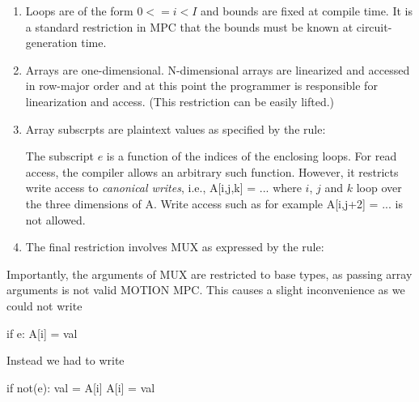 \documentclass[sigconf, screen, natbib=false, dvipsnames, table]{acmart}
\theoremstyle{definition}
\begin{document}
\begin{enumerate}
\item Loops are of the form $0 <= i < I$ and bounds are fixed at compile time. 
It is a standard restriction in MPC that the bounds must be known at circuit-generation time.
\item Arrays are one-dimensional. N-dimensional arrays are linearized and accessed 
in row-major order and at this point the programmer is responsible for linearization
and access. (This restriction can be easily lifted.)
\item Array subscrpts are plaintext values as specified by the rule:
\begin{semantics}
\end{semantics}
The subscript $e$ is a function of the indices of the enclosing loops. 
For read access, the compiler allows an arbitrary such function. 
However, it restricts write access to \emph{canonical writes}, i.e., {\sf A[i,j,k] = ...}
where $i$, $j$ and $k$ loop over the three dimensions of {\sf A}.  
Write access such as for example {\sf A[i,j+2] = ...} is not allowed. 
\item The final restriction involves MUX as expressed by the rule: 
\begin{semantics}
\end{semantics}
\end{enumerate}
Importantly, the arguments of MUX are restricted to base types, as passing array arguments 
is not valid MOTION MPC.  This causes a slight inconvenience as we could not write 
\begin{pythonn}
if e: A[i] = val
\end{pythonn}
Instead we had to write
\begin{pythonn}
if not(e): val = A[i]
A[i] = val
\end{pythonn}
\end{document}
